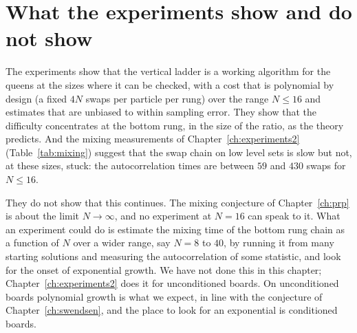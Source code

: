 \section{What the experiments show and do not show}

The experiments show that the vertical ladder is a working algorithm for the queens at the sizes where it can be checked, with a cost that is polynomial by design (a fixed $4N$ swaps per particle per rung) over the range $N \le 16$ and estimates that are unbiased to within sampling error. They show that the difficulty concentrates at the bottom rung, in the size of the ratio, as the theory predicts. And the mixing measurements of Chapter~\ref{ch:experiments2} (Table~\ref{tab:mixing}) suggest that the swap chain on low level sets is slow but not, at these sizes, stuck: the autocorrelation times are between $59$ and $430$ swaps for $N \le 16$.

They do not show that this continues. The mixing conjecture of Chapter~\ref{ch:prp} is about the limit $N \to \infty$, and no experiment at $N = 16$ can speak to it. What an experiment could do is estimate the mixing time of the bottom rung chain as a function of $N$ over a wider range, say $N = 8$ to $40$, by running it from many starting solutions and measuring the autocorrelation of some statistic, and look for the onset of exponential growth. We have not done this in this chapter; Chapter~\ref{ch:experiments2} does it for unconditioned boards. On unconditioned boards polynomial growth is what we expect, in line with the conjecture of Chapter~\ref{ch:swendsen}, and the place to look for an exponential is conditioned boards.
